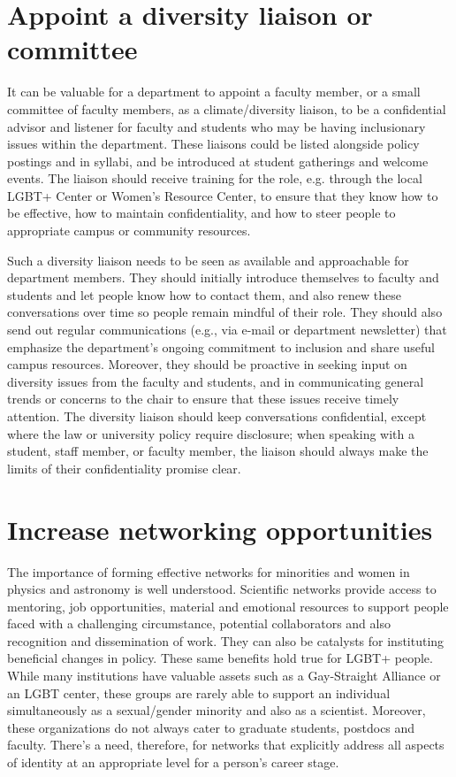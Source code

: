 \section {Appoint a diversity liaison or committee}
\label{liaison}
It can be valuable for a department to appoint a faculty member, or a small committee of faculty members, as a climate/diversity liaison, to be a confidential advisor and listener for faculty and students who may be having inclusionary issues within the department. These liaisons could be listed alongside policy postings and in syllabi, and be introduced at student gatherings and welcome events. The liaison should receive training for the role, e.g. through the local LGBT+ Center or Women's Resource Center, to ensure that they know how to be effective, how to maintain confidentiality, and how to steer people to appropriate campus or community resources. 

Such a diversity liaison needs to be seen as available and approachable for department members. They should initially introduce themselves to faculty and students and let people know how to contact them, and also renew these conversations over time so people remain mindful of their role. They should also send out regular communications (e.g., via e-mail or department newsletter) that emphasize the department's ongoing commitment to inclusion and share useful campus resources. Moreover, they should be proactive in seeking input on diversity issues from the faculty and students, and in communicating general trends or concerns to the chair to ensure that these issues receive timely attention. The diversity liaison should keep conversations confidential, except where the law or university policy require disclosure; when speaking with a student, staff member, or faculty member, the liaison should always make the limits of their confidentiality promise clear.


\section {Increase networking opportunities}
\label{networking}
The importance of forming effective networks for minorities and women in physics and astronomy is well understood. Scientific networks provide access to mentoring, job opportunities, material and emotional resources to support people faced with a challenging circumstance, potential collaborators and also recognition and dissemination of work. They can also be catalysts for instituting beneficial changes in policy. These same benefits hold true for LGBT+ people. While many institutions have valuable assets such as a Gay-Straight Alliance or an LGBT center, these groups are rarely able to support an individual simultaneously as a sexual/gender minority and also as a scientist. Moreover, these organizations do not always cater to graduate students, postdocs and faculty. There's a need, therefore, for networks that explicitly address all aspects of identity at an appropriate level for a person's career stage.

